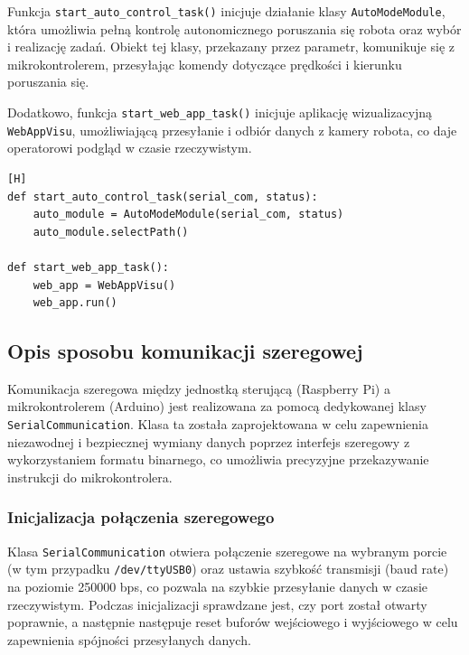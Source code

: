 Funkcja \texttt{start\_auto\_control\_task()} inicjuje działanie klasy \texttt{AutoModeModule}, która umożliwia pełną kontrolę autonomicznego poruszania się robota oraz wybór i realizację zadań. Obiekt tej klasy, przekazany przez parametr, komunikuje się z mikrokontrolerem, przesyłając komendy dotyczące prędkości i kierunku poruszania się.

Dodatkowo, funkcja \texttt{start\_web\_app\_task()} inicjuje aplikację wizualizacyjną \texttt{WebAppVisu}, umożliwiającą przesyłanie i odbiór danych z kamery robota, co daje operatorowi podgląd w czasie rzeczywistym.

\vspace*{0.5cm}


\begin{lstlisting}[caption=Kod funkcji uruchamiających zadania kontrolne robota, label=fig:task_start, captionpos=b][H]
def start_auto_control_task(serial_com, status):
    auto_module = AutoModeModule(serial_com, status)
    auto_module.selectPath()

def start_web_app_task():
    web_app = WebAppVisu()
    web_app.run()
\end{lstlisting}


\subsection{Opis sposobu komunikacji szeregowej}

Komunikacja szeregowa między jednostką sterującą (Raspberry Pi) a mikrokontrolerem (Arduino) jest realizowana za pomocą dedykowanej klasy \texttt{SerialCommunication}. Klasa ta została zaprojektowana w celu zapewnienia niezawodnej i bezpiecznej wymiany danych poprzez interfejs szeregowy z wykorzystaniem formatu binarnego, co umożliwia precyzyjne przekazywanie instrukcji do mikrokontrolera.

\subsubsection{Inicjalizacja połączenia szeregowego}

Klasa \texttt{SerialCommunication} otwiera połączenie szeregowe na wybranym porcie (w tym przypadku \texttt{/dev/ttyUSB0}) oraz ustawia szybkość transmisji (baud rate) na poziomie 250000 bps, co pozwala na szybkie przesyłanie danych w czasie rzeczywistym. Podczas inicjalizacji sprawdzane jest, czy port został otwarty poprawnie, a następnie następuje reset buforów wejściowego i wyjściowego w celu zapewnienia spójności przesyłanych danych.

